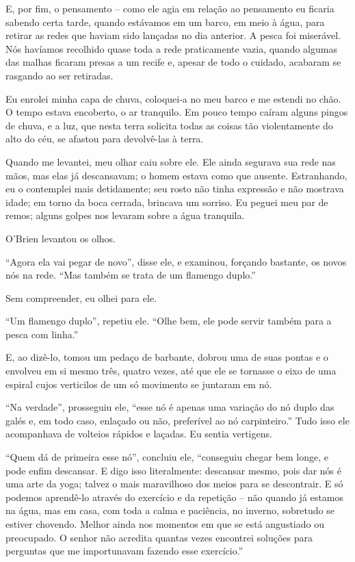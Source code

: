E, por fim, o pensamento -- como ele agia em relação ao pensamento eu
ficaria sabendo certa tarde, quando estávamos em um barco, em meio à
água, para retirar as redes que haviam sido lançadas no dia anterior. A
pesca foi miserável. Nós havíamos recolhido quase toda a rede
praticamente vazia, quando algumas das malhas ficaram presas a um recife
e, apesar de todo o cuidado, acabaram se rasgando ao ser retiradas.

Eu enrolei minha capa de chuva, coloquei-a no meu barco e me estendi no
chão. O tempo estava encoberto, o ar tranquilo. Em pouco tempo caíram
alguns pingos de chuva, e a luz, que nesta terra solicita todas as
coisas tão violentamente do alto do céu, se afastou para devolvê-las à
terra.

Quando me levantei, meu olhar caiu sobre ele. Ele ainda segurava sua
rede nas mãos, mas elas já descansavam; o homem estava como que ausente.
Estranhando, eu o contemplei mais detidamente; seu rosto não tinha
expressão e não mostrava idade; em torno da boca cerrada, brincava um
sorriso. Eu peguei meu par de remos; alguns golpes nos levaram sobre a
água tranquila.

O'Brien levantou os olhos.

``Agora ela vai pegar de novo'', disse ele, e examinou, forçando
bastante, os novos nós na rede. ``Mas também se trata de um flamengo
duplo.''

Sem compreender, eu olhei para ele.

``Um flamengo duplo'', repetiu ele. ``Olhe bem, ele pode servir também
para a pesca com linha.''

E, ao dizê-lo, tomou um pedaço de barbante, dobrou uma de suas pontas e
o envolveu em si mesmo três, quatro vezes, até que ele se tornasse o
eixo de uma espiral cujos verticilos de um só movimento se juntaram em
nó.

``Na verdade'', prosseguiu ele, ``esse nó é apenas uma variação do nó
duplo das galés e, em todo caso, enlaçado ou não, preferível ao nó
carpinteiro.'' Tudo isso ele acompanhava de volteios rápidos e laçadas.
Eu sentia vertigens.

``Quem dá de primeira esse nó'', concluiu ele, ``conseguiu chegar bem
longe, e pode enfim descansar. E digo isso literalmente: descansar
mesmo, pois dar nós é uma arte da yoga; talvez o mais maravilhoso dos
meios para se descontrair. E só podemos aprendê-lo através do exercício
e da repetição -- não quando já estamos na água, mas em casa, com toda a
calma e paciência, no inverno, sobretudo se estiver chovendo. Melhor
ainda nos momentos em que se está angustiado ou preocupado. O senhor não
acredita quantas vezes encontrei soluções para perguntas que me
importunavam fazendo esse exercício.''

